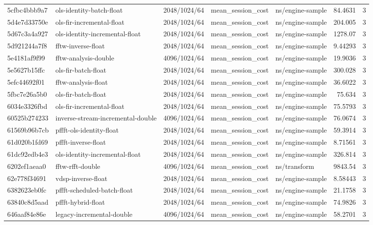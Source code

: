 \begin{longtable}{lllllrr}
5cfbc4bbb9a7 & ols-identity-batch-float & 2048/1024/64 & mean\_session\_cost & ns/engine-sample & 84.4631 & 3 \\
5d4e7d33750e & ols-fir-incremental-float & 2048/1024/64 & mean\_session\_cost & ns/engine-sample & 204.005 & 3 \\
5d67c3a4a927 & ols-identity-incremental-float & 2048/1024/64 & mean\_session\_cost & ns/engine-sample & 1278.07 & 3 \\
5d921244a7f8 & fftw-inverse-float & 2048/1024/64 & mean\_session\_cost & ns/engine-sample & 9.44293 & 3 \\
5e4181af9f99 & fftw-analysis-double & 4096/1024/64 & mean\_session\_cost & ns/engine-sample & 19.9036 & 3 \\
5e5627b15ffc & ols-fir-batch-float & 2048/1024/64 & mean\_session\_cost & ns/engine-sample & 300.028 & 3 \\
5efc44692f01 & fftw-analysis-float & 2048/1024/64 & mean\_session\_cost & ns/engine-sample & 36.6022 & 3 \\
5fbc7e26a5b0 & ols-fir-batch-float & 2048/1024/64 & mean\_session\_cost & ns/engine-sample & 75.634 & 3 \\
6034e3326fbd & ols-fir-incremental-float & 2048/1024/64 & mean\_session\_cost & ns/engine-sample & 75.5793 & 3 \\
60525b274233 & inverse-stream-incremental-double & 4096/1024/64 & mean\_session\_cost & ns/engine-sample & 76.0674 & 3 \\
61569b96b7cb & pffft-ols-identity-float & 2048/1024/64 & mean\_session\_cost & ns/engine-sample & 59.3914 & 3 \\
61d020b1fd69 & pffft-inverse-float & 2048/1024/64 & mean\_session\_cost & ns/engine-sample & 8.71561 & 3 \\
61dc92edb4e3 & ols-identity-incremental-float & 2048/1024/64 & mean\_session\_cost & ns/engine-sample & 326.814 & 3 \\
6202ef1aeaa0 & fftw-rfft-double & 4096/1024/64 & mean\_session\_cost & ns/transform & 9843.54 & 3 \\
62e778f34691 & vdsp-inverse-float & 2048/1024/64 & mean\_session\_cost & ns/engine-sample & 8.58443 & 3 \\
6382623eb0fc & pffft-scheduled-batch-float & 2048/1024/64 & mean\_session\_cost & ns/engine-sample & 21.1758 & 3 \\
63840c8d5aad & pffft-hybrid-float & 2048/1024/64 & mean\_session\_cost & ns/engine-sample & 74.9826 & 3 \\
646aaf84e86e & legacy-incremental-double & 4096/1024/64 & mean\_session\_cost & ns/engine-sample & 58.2701 & 3 \\

\end{longtable}
